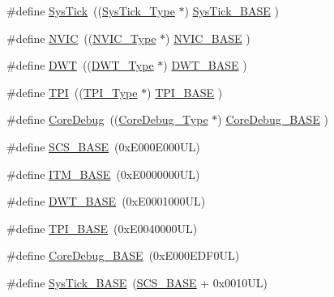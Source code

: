 \begin{DoxyCompactItemize}
\#define \hyperlink{group___c_m_s_i_s__core__base_gacd96c53beeaff8f603fcda425eb295de}{Sys\+Tick}~((\hyperlink{struct_sys_tick___type}{Sys\+Tick\+\_\+\+Type}   $\ast$)     \hyperlink{group___c_m_s_i_s__core__base_ga58effaac0b93006b756d33209e814646}{Sys\+Tick\+\_\+\+B\+A\+SE}     )
\item 
\#define \hyperlink{group___c_m_s_i_s__core__base_gac8e97e8ce56ae9f57da1363a937f8a17}{N\+V\+IC}~((\hyperlink{struct_n_v_i_c___type}{N\+V\+I\+C\+\_\+\+Type}      $\ast$)     \hyperlink{group___c_m_s_i_s__core__base_gaa0288691785a5f868238e0468b39523d}{N\+V\+I\+C\+\_\+\+B\+A\+SE}        )
\item 
\#define \hyperlink{group___c_m_s_i_s__core__base_gabbe5a060185e1d5afa3f85b14e10a6ce}{D\+WT}~((\hyperlink{struct_d_w_t___type}{D\+W\+T\+\_\+\+Type}       $\ast$)     \hyperlink{group___c_m_s_i_s__core__base_gafdab534f961bf8935eb456cb7700dcd2}{D\+W\+T\+\_\+\+B\+A\+SE}         )
\item 
\#define \hyperlink{group___c_m_s_i_s__core__base_ga8b4dd00016aed25a0ea54e9a9acd1239}{T\+PI}~((\hyperlink{struct_t_p_i___type}{T\+P\+I\+\_\+\+Type}       $\ast$)     \hyperlink{group___c_m_s_i_s__core__base_ga2b1eeff850a7e418844ca847145a1a68}{T\+P\+I\+\_\+\+B\+A\+SE}         )
\item 
\#define \hyperlink{group___c_m_s_i_s__core__base_gab6e30a2b802d9021619dbb0be7f5d63d}{Core\+Debug}~((\hyperlink{struct_core_debug___type}{Core\+Debug\+\_\+\+Type} $\ast$)     \hyperlink{group___c_m_s_i_s__core__base_ga680604dbcda9e9b31a1639fcffe5230b}{Core\+Debug\+\_\+\+B\+A\+SE}   )
\item 
\#define \hyperlink{group___c_m_s_i_s__core__base_ga3c14ed93192c8d9143322bbf77ebf770}{S\+C\+S\+\_\+\+B\+A\+SE}~(0x\+E000\+E000\+U\+L)
\item 
\#define \hyperlink{group___c_m_s_i_s__core__base_gadd76251e412a195ec0a8f47227a8359e}{I\+T\+M\+\_\+\+B\+A\+SE}~(0x\+E0000000\+U\+L)
\item 
\#define \hyperlink{group___c_m_s_i_s__core__base_gafdab534f961bf8935eb456cb7700dcd2}{D\+W\+T\+\_\+\+B\+A\+SE}~(0x\+E0001000\+U\+L)
\item 
\#define \hyperlink{group___c_m_s_i_s__core__base_ga2b1eeff850a7e418844ca847145a1a68}{T\+P\+I\+\_\+\+B\+A\+SE}~(0x\+E0040000\+U\+L)
\item 
\#define \hyperlink{group___c_m_s_i_s__core__base_ga680604dbcda9e9b31a1639fcffe5230b}{Core\+Debug\+\_\+\+B\+A\+SE}~(0x\+E000\+E\+D\+F0\+U\+L)
\item 
\#define \hyperlink{group___c_m_s_i_s__core__base_ga58effaac0b93006b756d33209e814646}{Sys\+Tick\+\_\+\+B\+A\+SE}~(\hyperlink{group___c_m_s_i_s__core__base_ga3c14ed93192c8d9143322bbf77ebf770}{S\+C\+S\+\_\+\+B\+A\+SE} +  0x0010\+U\+L)

\end{DoxyCompactItemize}
